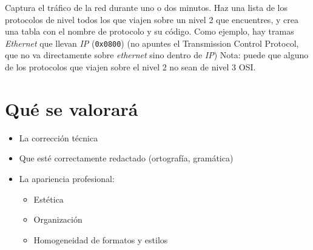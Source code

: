 \begin{homeworkProblem}
  Captura el tráfico de la red durante uno o dos minutos. Haz una lista de los protocolos de nivel todos los que viajen sobre un nivel 2 que encuentres, y crea una tabla con el nombre de protocolo y su código. Como ejemplo, hay tramas \textit{Ethernet} que llevan \textit{IP} (\texttt{0x0800}) (no apuntes el Transmission Control Protocol, que no va directamente sobre \textit{ethernet} sino dentro de \textit{IP})
  Nota: puede que alguno de los protocolos que viajen sobre el nivel 2 no sean de nivel 3 OSI.
\end{homeworkProblem}


\section{Qué se valorará}

\begin{itemize}
\item La corrección técnica 
\item Que esté correctamente redactado (ortografía, gramática)
\item La apariencia profesional:
  \begin{itemize}
  \item Estética
  \item Organización
  \item Homogeneidad de formatos y estilos
  \end{itemize}
\end{itemize}

